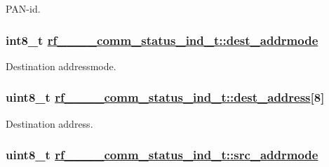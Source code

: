 PAN-id. \hypertarget{structrf__802__15__4__comm__status__ind__t_71c54d414c1afbeb6074a8d0487cafde}{
\subsubsection[dest\_\-addrmode]{\setlength{\rightskip}{0pt plus 5cm}int8\_\-t \hyperlink{structrf__802__15__4__comm__status__ind__t_71c54d414c1afbeb6074a8d0487cafde}{rf\_\_\_\_\-comm\_\-status\_\-ind\_\-t::dest\_\-addrmode}}}
\label{structrf__802__15__4__comm__status__ind__t_71c54d414c1afbeb6074a8d0487cafde}


Destination addressmode. \hypertarget{structrf__802__15__4__comm__status__ind__t_0c1a4fe2334dbc01043e3837b7c60732}{
\subsubsection[dest\_\-address]{\setlength{\rightskip}{0pt plus 5cm}uint8\_\-t \hyperlink{structrf__802__15__4__comm__status__ind__t_0c1a4fe2334dbc01043e3837b7c60732}{rf\_\_\_\_\-comm\_\-status\_\-ind\_\-t::dest\_\-address}\mbox{[}8\mbox{]}}}
\label{structrf__802__15__4__comm__status__ind__t_0c1a4fe2334dbc01043e3837b7c60732}


Destination address. \hypertarget{structrf__802__15__4__comm__status__ind__t_1deccf74af49075ccf27788bf7a41084}{
\subsubsection[src\_\-addrmode]{\setlength{\rightskip}{0pt plus 5cm}uint8\_\-t \hyperlink{structrf__802__15__4__comm__status__ind__t_1deccf74af49075ccf27788bf7a41084}{rf\_\_\_\_\-comm\_\-status\_\-ind\_\-t::src\_\-addrmode}}}
\label{structrf__802__15__4__comm__status__ind__t_1deccf74af49075ccf27788bf7a41084}


